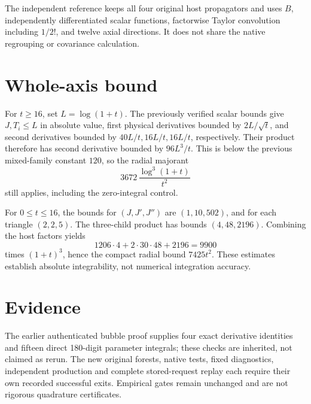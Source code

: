 \documentclass[11pt]{article}
\begin{document}
The independent reference keeps all four original host propagators
and uses \(B\), independently differentiated scalar functions,
factorwise Taylor convolution including \(1/2!\), and twelve axial
directions. It does not share the native regrouping or covariance
calculation.

\section*{Whole-axis bound}
For \(t\geq16\), set \(L=\log(1+t)\). The previously verified scalar
bounds give \(J,T_i\leq L\) in absolute value, first physical
derivatives bounded by \(2L/\sqrt t\), and second derivatives
bounded by \(40L/t,16L/t,16L/t\), respectively.
Their product therefore has second derivative bounded by
\(96L^3/t\). This is below the previous mixed-family constant
\(120\), so the radial majorant
\[
 3672\,\frac{\log^3(1+t)}{t^2}
\]
still applies, including the zero-integral control.

For \(0\leq t\leq16\), the bounds for
\((J,J',J'')\) are \((1,10,502)\), and for each triangle
\((2,2,5)\). The three-child product has bounds \((4,48,2196)\).
Combining the host factors yields
\[
 1206\cdot4+2\cdot30\cdot48+2196=9900
\]
times \((1+t)^3\), hence the compact radial bound \(7425t^2\).
These estimates establish absolute integrability, not numerical
integration accuracy.

\section*{Evidence}
The earlier authenticated bubble proof supplies four exact
derivative identities and fifteen direct 180-digit parameter
integrals; these checks are inherited, not claimed as rerun.
The new original forests, native tests, fixed diagnostics,
independent production and complete stored-request replay each
require their own recorded successful exits. Empirical gates
remain unchanged and are not rigorous quadrature certificates.
\end{document}
